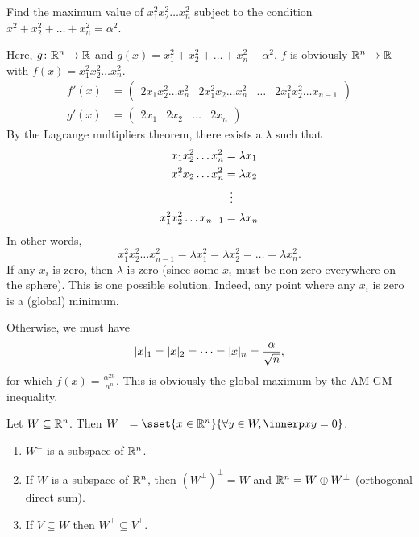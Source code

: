 \begin{examples}
    \item Find the maximum value of $x_1^2x_2^2\dots x_n^2$ subject to the
    condition $x_1^2 + x_2^2 + \dots + x_n^2 = \alpha^2$.

    Here, $g\colon \mathbb{R}^n \to \mathbb{R}$ and $g(x) = x_1^2 + x_2^2 + \dots + x_n^2
    - \alpha^2$.
    $f$ is obviously $\mathbb{R}^n \to \mathbb{R}$ with $f(x) = x_1^2x_2^2\dots x_n^2$.
    \begin{align*}
        f'(x) &= \begin{pmatrix}
            2x_1x_2^2\dots x_n^2
            & 2x_1^2x_2\dots x_n^2
            & \dots
            & 2x_1^2x_2^2\dots x_{n-1}
        \end{pmatrix} \\
        g'(x) &= \begin{pmatrix}
            2x_1 & 2x_2 & \dots & 2x_n
        \end{pmatrix}
    \end{align*}
    By the Lagrange multipliers theorem, there exists a $\lambda$ such that
    \begin{align*}
        x_1 x_2^2 \dots x_n^2 &= \lambda x_1 \\
        x_1^2 x_2 \dots x_n^2 &= \lambda x_2 \\
        &\vdotswithin{=} \\
        x_1^2 x_2^2 \dots x_{n-1} &= \lambda x_n
    \end{align*}
    In other words, \[
        x_1^2 x_2^2 \dots x_{n-1}^2 = \lambda x_1^2 = \lambda x_2^2 = \dots
        = \lambda x_n^2.
    \] If any $x_i$ is zero, then $\lambda$ is zero (since some $x_i$ must
    be non-zero everywhere on the sphere).
    This is one possible solution.
    Indeed, any point where any $x_i$ is zero is a (global) minimum.

    Otherwise, we must have \[
        \lvert x\rvert_1 = \lvert x\rvert_2 = \dots = \lvert x\rvert_n = \frac{\alpha}{\sqrt n},
    \] for which $f(x) = \frac{\alpha^{2n}}{n^n}$.
    This is obviously the global maximum by the AM-GM inequality.
\end{examples}

Let $W \subseteq \mathbb{R}^n$.
Then $W^\perp = \sset{x \in \R^n}{\forall y \in W, \innerp xy = 0}$.
\begin{exercise*} \leavevmode
    \begin{enumerate}
        \item $W^\perp$ is a subspace of $\mathbb{R}^n$.
        \item If $W$ is a subspace of $\mathbb{R}^n$, then $(W^\perp)^\perp = W$
        and $\mathbb{R}^n = W \oplus W^\perp$ (orthogonal direct sum).
        \item If $V \subseteq W$ then $W^\perp \subseteq V^\perp$.
    \end{enumerate}
\end{exercise*}
